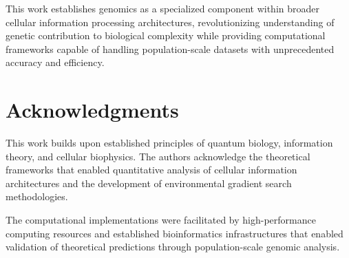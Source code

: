 \documentclass[12pt,a4paper]{article}
\begin{document}
This work establishes genomics as a specialized component within broader cellular information processing architectures, revolutionizing understanding of genetic contribution to biological complexity while providing computational frameworks capable of handling population-scale datasets with unprecedented accuracy and efficiency.

\section*{Acknowledgments}

This work builds upon established principles of quantum biology, information theory, and cellular biophysics. The authors acknowledge the theoretical frameworks that enabled quantitative analysis of cellular information architectures and the development of environmental gradient search methodologies.

The computational implementations were facilitated by high-performance computing resources and established bioinformatics infrastructures that enabled validation of theoretical predictions through population-scale genomic analysis.
\end{document}
